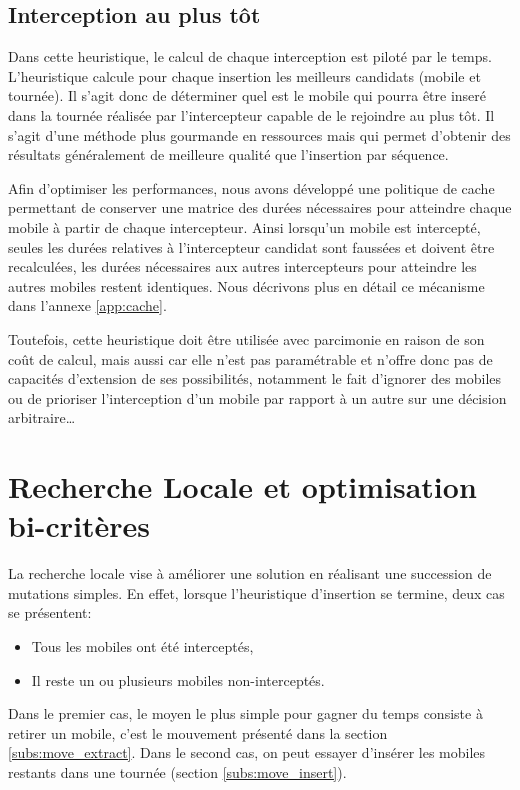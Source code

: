 		\subsection{Interception au plus tôt}
		\label{sub:heuristic_fastest}
			Dans cette heuristique, le calcul de chaque interception est piloté par le temps. L'heuristique calcule pour chaque insertion les meilleurs candidats (mobile et tournée). Il s'agit donc de déterminer quel est le mobile qui pourra être inseré dans la tournée réalisée par l'intercepteur capable de le rejoindre au plus tôt. Il s'agit d'une méthode plus gourmande en ressources mais qui permet d'obtenir des résultats généralement de meilleure qualité que l'insertion par séquence.

			Afin d'optimiser les performances, nous avons développé une politique de \gls{cache} permettant de conserver une matrice des durées nécessaires pour atteindre chaque mobile à partir de chaque intercepteur. Ainsi lorsqu'un mobile est intercepté, seules les durées relatives à l'intercepteur candidat sont faussées et doivent être recalculées, les durées nécessaires aux autres intercepteurs pour atteindre les autres mobiles restent identiques. Nous décrivons plus en détail ce mécanisme dans l'annexe \ref{app:cache}.

			Toutefois, cette heuristique doit être utilisée avec parcimonie en raison de son coût de calcul, mais aussi car elle n'est pas paramétrable et n'offre donc pas de capacités d'extension de ses possibilités, notamment le fait d'ignorer des mobiles ou de prioriser l'interception d'un mobile par rapport à un autre sur une décision arbitraire\ldots

	\section{Recherche Locale et optimisation bi-critères}
		La recherche locale vise à améliorer une solution en réalisant une succession de mutations simples. En effet, lorsque l'heuristique d'insertion se termine, deux cas se présentent:
		\begin{itemize}
			\item Tous les mobiles ont été interceptés,
			\item Il reste un ou plusieurs mobiles non-interceptés.
		\end{itemize}

		Dans le premier cas, le moyen le plus simple pour gagner du temps consiste à retirer un mobile, c'est le mouvement présenté dans la section \ref{subs:move_extract}. Dans le second cas, on peut essayer d'insérer les mobiles restants dans une tournée (section \ref{subs:move_insert}).

